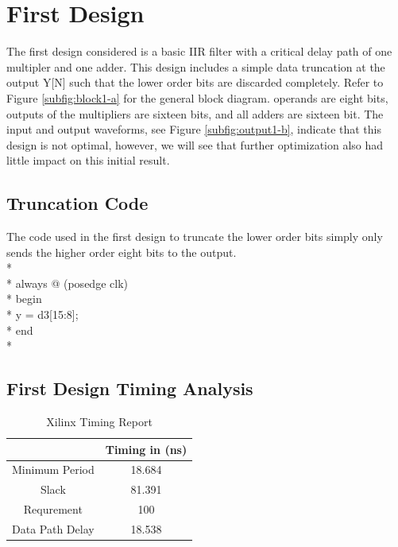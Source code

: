\section*{First Design}
The first design considered is a basic IIR filter with a critical delay path of one multipler and one adder. This design includes a simple data truncation at the output Y[N] such that the lower order bits are discarded completely. Refer to Figure \ref{subfig:block1-a} for the general block diagram. operands are eight bits, outputs of the multipliers are sixteen bits, and all adders are sixteen bit. The input and output waveforms, see Figure \ref{subfig:output1-b}, indicate that this design is not optimal, however, we will see that further optimization also had little impact on this initial result.

\subsection*{Truncation Code}
The code used in the first design to truncate the lower order bits simply only sends the higher order eight bits to the output.\\*
\\*
always @ (posedge clk)\\*
begin	\\*
y = d3[15:8];\\*
end\\*

\subsection*{First Design Timing Analysis}

\begin{table}[bh]
\caption{Xilinx Timing Report}
\begin{tabular}{c|c}
\centering
           & Timing in (ns) \\
\hline
Minimum Period &     18.684 \\

     Slack &     81.391 \\

Requrement &        100 \\

Data Path Delay &     18.538 \\
\end{tabular}  
\label{tab:timing1}
\end{table}

